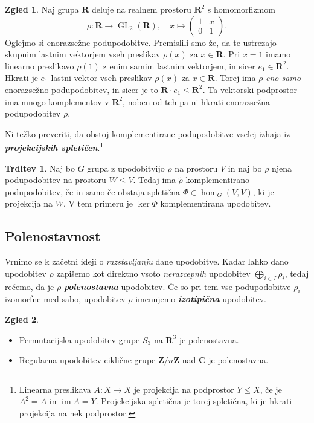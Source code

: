 \documentclass[11pt]{book}
\def\ZZ{\mathbf{Z}}
\def\RR{\mathbf{R}}
\def\CC{\mathbf{C}}
\DeclareMathOperator\image{im}
\DeclareMathOperator\GL{GL}
\def\definicija{\color{rdeca}\bf\em}
\theoremstyle{definition}
\theoremstyle{zgled}
\newtheorem*{zgled}{Zgled}
\theoremstyle{odprtproblem}
\theoremstyle{domacanaloga}
\theoremstyle{izrek}
\newtheorem*{trditev}{Trditev}
\begin{document}
\begin{zgled}
Naj grupa $\RR$ deluje na realnem prostoru $\RR^2$ s homomorfizmom
    \[
        \rho \colon \RR \to {\textstyle \GL_2(\RR)}, \quad
        x \mapsto 
        \begin{pmatrix} 
        1 & x \\ 0 & 1 
    \end{pmatrix}.
\]
Oglejmo si enorazsežne podupodobitve. Premislili smo že, da te ustrezajo skupnim lastnim vektorjem vseh preslikav $\rho(x)$ za $x \in \RR$. Pri $x = 1$ imamo linearno preslikavo $\rho(1)$ z enim samim lastnim vektorjem, in sicer $e_1 \in \RR^2$. Hkrati je $e_1$ lastni vektor vseh preslikav $\rho(x)$ za $x \in \RR$. Torej ima $\rho$ \emph{eno samo} enorazsežno podupodobitev, in sicer je to $\RR \cdot e_1 \leq \RR^2$. Ta vektorski podprostor ima mnogo komplementov v $\RR^2$, noben od teh pa ni hkrati enorazsežna podupodobitev $\rho$.
\end{zgled}

Ni težko preveriti, da obstoj komplementirane podupodobitve vselej izhaja iz {\definicija projekcijskih spletičen}.\footnote{Linearna preslikava $A \colon X \to X$ je projekcija na podprostor $Y \leq X$, če je $A^2 = A$ in $\image A = Y$. Projekcijska spletična je torej spletična, ki je hkrati projekcija na nek podprostor.}

\begin{trditev}
Naj bo $G$ grupa z upodobitvijo $\rho$ na prostoru $V$ in naj bo $\tilde \rho$ njena podupodobitev na prostoru $W \leq V$. Tedaj ima $\tilde \rho$ komplementirano podupodobitev, če in samo če obstaja spletična $\Phi \in \hom_G(V,V)$, ki je projekcija na $W$. V tem primeru je $\ker \Phi$ komplementirana upodobitev.
\end{trditev}

\subsection{Polenostavnost}

Vrnimo se k začetni ideji o \emph{razstavljanju} dane upodobitve. Kadar lahko dano upodobitev $\rho$ zapišemo kot direktno vsoto \emph{nerazcepnih} upodobitev $\bigoplus_{i \in I} \rho_i$, tedaj rečemo, da je $\rho$ {\definicija polenostavna} upodobitev. Če so pri tem vse podupodobitve $\rho_i$ izomorfne med sabo, upodobitev $\rho$ imenujemo {\definicija izotipična} upodobitev.

\begin{zgled} \leavevmode
    \begin{itemize}
        \item Permutacijska upodobitev grupe $S_3$ na $\RR^3$ je polenostavna.
        \item Regularna upodobitev ciklične grupe $\ZZ/n\ZZ$ nad $\CC$ je polenostavna.
    \end{itemize}
\end{zgled}
\end{document}
